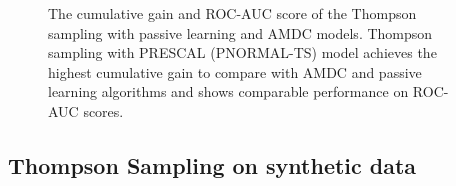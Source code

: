 \begin{figure}[t]
	\centering
	
	\caption{\label{fig:vs_greedy} The cumulative gain and ROC-AUC score of the Thompson sampling with passive learning and  AMDC models. Thompson sampling with PRESCAL (PNORMAL-TS) model achieves the highest cumulative gain to compare with AMDC and passive learning algorithms and shows comparable performance on ROC-AUC scores.}
\end{figure}

\subsection{Thompson Sampling on synthetic data}

